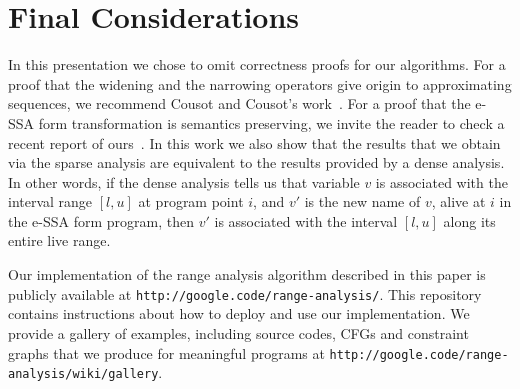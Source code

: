 \documentclass{llncs}
\begin{document}





\section{Final Considerations}
\label{sec:con}

In this presentation we chose to omit correctness proofs for our algorithms.
For a proof that the widening and the narrowing operators give origin to
approximating sequences, we recommend Cousot and Cousot's work~\cite{Cousot77}.
For a proof that the e-SSA form transformation is semantics preserving, we
invite the reader to check a recent report of ours~\cite{XXXX}.
In this work we also show that the results that we obtain via the
sparse analysis are equivalent to the results provided by a dense analysis.
In other words, if the dense analysis tells us that variable $v$ is
associated with the interval range $[l, u]$ at program point $i$, and $v'$
is the new name of $v$, alive at $i$ in the e-SSA form program, then $v'$ is
associated with the interval $[l, u]$ along its entire live range.

Our implementation of the range analysis algorithm described in this paper is
publicly available at \texttt{http://google.code/range-analysis/}.
This repository contains instructions about how to deploy and use our
implementation.
We provide a gallery of examples, including source codes,
CFGs and constraint graphs that we produce for meaningful programs at
\texttt{http://google.code/range-analysis/wiki/gallery}.



\end{document}
